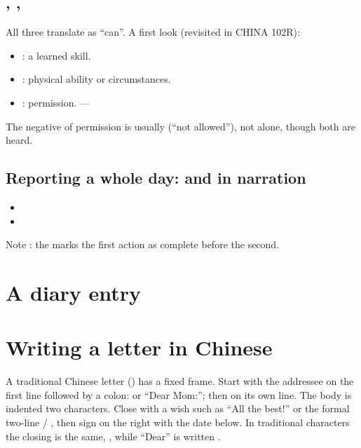 \subsection{, , }

All three translate as ``can''. A first look (revisited in CHINA 102R):
\begin{itemize}
  \item {}: a learned skill. 
  \item {}: physical ability or circumstances. 
  \item {}: permission. ---
\end{itemize}
The negative of permission is usually  (``not allowed''), not 
alone, though both are heard.

\subsection{Reporting a whole day:  and  in narration}

\begin{itemize}
  \item {}
  \item {}
\end{itemize}
Note : the  marks the first action as complete before the second.

\section{A diary entry}

\begin{example}[\zh{我的一天}]

\end{example}

\section{Writing a letter in Chinese}

\begin{aside}
A traditional Chinese letter () has a fixed frame. Start with the addressee on
the first line followed by a colon:  or  ``Dear Mom:''; then
 on its own line. The body is indented two characters. Close with a wish such
as  ``All the best!'' or the formal two-line  / , then
sign on the right with the date below. In traditional characters the closing is the
same, , while ``Dear''  is written .
\end{aside}

